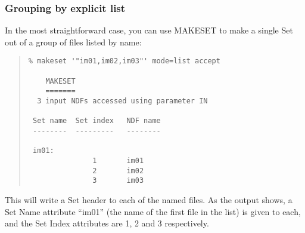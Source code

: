 \documentclass[twoside,11pt]{article}
\newcommand{\htmlref}[2]{#1}
\renewcommand{\_}{\texttt{\symbol{95}}}
\newenvironment{myquote}{\begin{quote}\begin{small}}{\end{small}\end{quote}}
\newcommand{\xroutine}[1]{\htmlref{{\sc #1}}{#1}}
\begin{document}
\subsubsection{\label{makeset_list}Grouping by explicit list}

In the most straightforward case, you can use \xroutine{MAKESET} 
to make a single Set out of a group of files listed by name:
\begin{myquote}
\begin{verbatim}
% makeset '"im01,im02,im03"' mode=list accept

    MAKESET
    =======
  3 input NDFs accessed using parameter IN

 Set name  Set index   NDF name
 --------  ---------   --------

 im01:
               1       im01
               2       im02
               3       im03
\end{verbatim}
\end{myquote}
This will write a Set header to each of the named files.
As the output shows, a Set Name attribute ``im01'' 
(the name of the first file in the list) is given to each, 
and the Set Index attributes are 1, 2 and 3 respectively.
\end{document}

